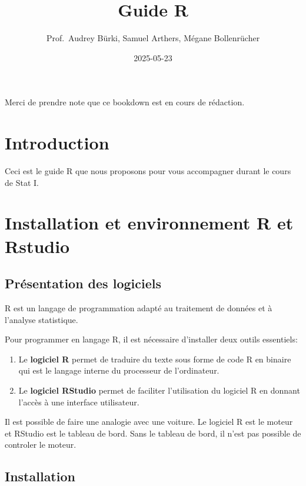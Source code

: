 \documentclass[
]{book}
\title{Guide R}
\author{Prof.~Audrey Bürki, Samuel Arthers, Mégane Bollenrücher}
\date{2025-05-23}
\providecommand{\tightlist}{%
  \setlength{\itemsep}{0pt}\setlength{\parskip}{0pt}}
\begin{document}
\maketitle

{
\setcounter{tocdepth}{1}
\tableofcontents
}
Merci de prendre note que ce bookdown est en cours de rédaction.

\chapter{Introduction}\label{introduction}

Ceci est le guide R que nous proposons pour vous accompagner durant le cours de Stat I.

\chapter{Installation et environnement R et Rstudio}\label{installation-et-environnement-r-et-rstudio}

\section{Présentation des logiciels}\label{pruxe9sentation-des-logiciels}

R est un langage de programmation adapté au traitement de données et à l'analyse statistique.

Pour programmer en langage R, il est nécessaire d'installer deux outils essentiels:

\begin{enumerate}
\def\labelenumi{\arabic{enumi}.}
\tightlist
\item
  Le \textbf{logiciel R} permet de traduire du texte sous forme de code R en binaire qui est le langage interne du processeur de l'ordinateur.
\item
  Le \textbf{logiciel RStudio} permet de faciliter l'utilisation du logiciel R en donnant l'accès à une interface utilisateur.
\end{enumerate}

Il est possible de faire une analogie avec une voiture. Le logiciel R est le moteur et RStudio est le tableau de bord. Sans le tableau de bord, il n'est pas possible de controler le moteur.

\section{Installation}\label{installation}
\end{document}
